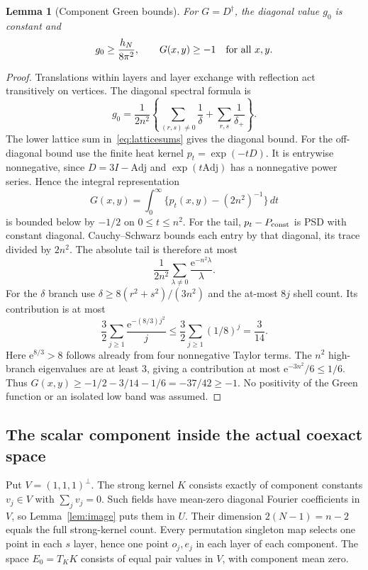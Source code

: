 \documentclass[11pt]{article}
\newcommand{\e}{\mathrm e}
\newtheorem{lemma}[theorem]{Lemma}
\theoremstyle{definition}
\theoremstyle{remark}
\begin{document}
\begin{lemma}[Component Green bounds]\label{lem:green}
For $G=D^\dagger$, the diagonal value $g_0$ is constant and
\[
                   g_0\ge\frac{h_N}{8\pi^2},\qquad
                   G(x,y)\ge-1\quad\hbox{for all }x,y.
\]
\end{lemma}
\begin{proof}
Translations within layers and layer exchange with reflection act
transitively on vertices. The diagonal spectral formula is
\[
 g_0=\frac1{2n^2}\left\{
       \sum_{(r,s)\ne0}\frac1\delta+\sum_{r,s}\frac1{\delta_+}\right\}.
\]
The lower lattice sum in~\eqref{eq:latticesums} gives the diagonal bound.
For the off-diagonal bound use the finite heat kernel $p_t=\exp(-tD)$.
It is entrywise nonnegative, since $D=3I-\mathrm{Adj}$ and
$\exp(t\mathrm{Adj})$ has a nonnegative power series. Hence the integral
representation
\[
 G(x,y)=\int_0^\infty\{p_t(x,y)-(2n^2)^{-1}\}\,dt
\]
is bounded below by $-1/2$ on $0\le t\le n^2$. For the tail,
$p_t-P_{\rm const}$ is PSD with constant diagonal. Cauchy--Schwarz bounds
each entry by that diagonal, its trace divided by $2n^2$. The absolute
tail is therefore at most
\[
            \frac1{2n^2}\sum_{\lambda\ne0}
                         \frac{\e^{-n^2\lambda}}\lambda.
\]
For the $\delta$ branch use $\delta\ge8(r^2+s^2)/(3n^2)$ and the at-most
$8j$ shell count. Its contribution is at most
\[
 \frac32\sum_{j\ge1}\frac{\e^{-(8/3)j^2}}j
       \le\frac32\sum_{j\ge1}(1/8)^j=\frac3{14}.
\]
Here $\e^{8/3}>8$ follows already from four nonnegative Taylor terms.
The $n^2$ high-branch eigenvalues are at least $3$, giving a contribution
at most $\e^{-3n^2}/6\le1/6$. Thus
$G(x,y)\ge-1/2-3/14-1/6=-37/42\ge-1$. No positivity of the Green function
or an isolated low band was assumed.
\end{proof}

\subsection{The scalar component inside the actual coexact space}
Put $V=(1,1,1)^\perp$. The strong kernel $K$ consists exactly of component
constants $v_j\in V$ with $\sum_jv_j=0$. Such fields have mean-zero
diagonal Fourier coefficients in $V$, so Lemma~\ref{lem:image} puts them
in $U$. Their dimension $2(N-1)=n-2$ equals the full strong-kernel count.
Every permutation singleton map selects one point in each $s$ layer,
hence one point $o_j,e_j$ in each layer of each component. The space
$E_0=T_KK$ consists of equal pair values in $V$, with component mean zero.
\end{document}
